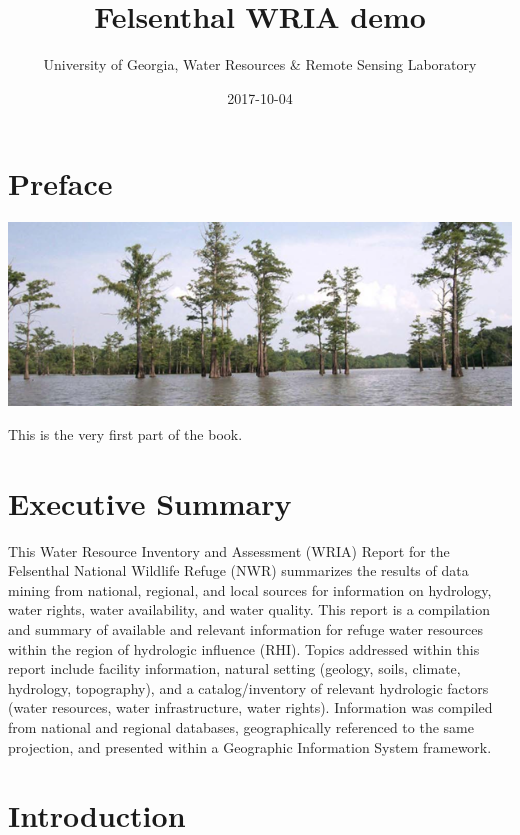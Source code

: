 \documentclass[]{book}
\title{Felsenthal WRIA demo}
\author{University of Georgia, Water Resources \& Remote Sensing Laboratory}
\date{2017-10-04}
\begin{document}
\maketitle

{
\setcounter{tocdepth}{1}
\tableofcontents
}
\chapter*{Preface}\label{preface}

\begin{center}\includegraphics{images/cypress_swamp} \end{center}

This is the very first part of the book.

\chapter{Executive Summary}\label{executive-summary}

This Water Resource Inventory and Assessment (WRIA) Report for the
Felsenthal National Wildlife Refuge (NWR) summarizes the results of data
mining from national, regional, and local sources for information on
hydrology, water rights, water availability, and water quality. This
report is a compilation and summary of available and relevant
information for refuge water resources within the region of hydrologic
influence (RHI). Topics addressed within this report include facility
information, natural setting (geology, soils, climate, hydrology,
topography), and a catalog/inventory of relevant hydrologic factors
(water resources, water infrastructure, water rights). Information was
compiled from national and regional databases, geographically referenced
to the same projection, and presented within a Geographic Information
System framework.

\chapter{Introduction}\label{introduction}
\end{document}
